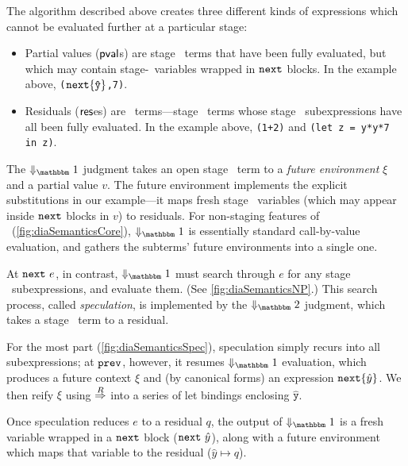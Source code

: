 The algorithm described above creates three different kinds of expressions which
cannot be evaluated further at a particular stage:
\begin{itemize}
\item Partial values ($\mathsf{pval}$s) are stage \bbone\ terms that have been fully
evaluated, but which may contain stage-\bbtwo\ variables wrapped in ${\tt next}$
blocks.  In the example above, 
\verb|(|${\tt next} \{\mathtt{\hat y}\}$\verb|,7)|.

\item Residuals ($\mathsf{res}$es) are \langTwo\ terms---stage \bbtwo\ terms whose
stage \bbone\ subexpressions have all been fully evaluated. In the example
above,
\verb|(1+2)| and \verb|(let z = y*y*7 in z)|.

\end{itemize}


The $\redonesym$ judgment takes an open stage \bbone\ term to a {\em future
environment} $\xi$ and a partial value $v$.  The future environment implements
the explicit substitutions in our example---it maps fresh stage \bbtwo\
variables (which may appear inside ${\tt next}$ blocks in $v$) to
residuals. For non-staging features of \lang\ (\ref{fig:diaSemanticsCore}),
$\redonesym$ is essentially standard call-by-value evaluation, and gathers the
subterms' future environments into a single one.


At ${\tt next}~e$, in contrast, $\redonesym$ must search through $e$ for any stage
\bbone\ subexpressions, and evaluate them.  (See \ref{fig:diaSemanticsNP}.)
This search process, called \emph{speculation}, is implemented by the
$\redtwosym$ judgment, which takes a stage \bbtwo\ term to a residual. 

For the most part (\ref{fig:diaSemanticsSpec}), speculation simply recurs into
all subexpressions; at ${\tt prev}$, however, it resumes $\redonesym$ evaluation,
which produces a future context $\xi$ and (by canonical forms) an expression
${\tt next}\{\hat y\}$. We then reify $\xi$ using $\overset{R}\Rightarrow$ into a series of let
bindings enclosing $\mathtt{\hat y}$.

Once speculation reduces $e$ to a residual $q$, the output of $\redonesym$ is a
fresh variable wrapped in a ${\tt next}$ block (${\tt next}~\hat y$), along with a future
environment which maps that variable to the residual ($\hat y \mapsto q$).


